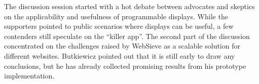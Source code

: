The discussion session started with a hot debate between advocates and
skeptics on the applicability and usefulness of programmable displays.
While the supporters pointed to public scenarios where displays can be
useful, a few contenders still speculate on the ``killer
app''. The second part of the discussion concentrated on the
challenges raised by WebSieve as a scalable
solution for different websites. Butkiewicz pointed out that it is still
early to draw any conclusions, but he has already collected promising
results from his prototype implementation.
